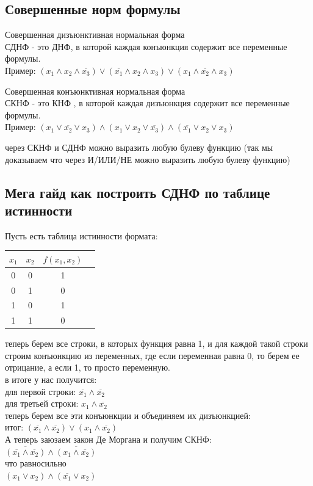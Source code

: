 \subsection{Совершенные норм формулы}
\begin{definition}{Совершенная дизъюнктивная нормальная форма}
  \\
  СДНФ - это ДНФ, в которой каждая конъюнкция содержит все переменные формулы. \\
  Пример: $(x_1 \land x_2 \land \overline{x_3}) \lor (\overline{x_1} \land x_2 \land x_3) \lor (x_1 \land \overline{x_2} \land x_3)$
\end{definition}
\begin{definition}{Совершенная конъюнктивная нормальная форма}
  \\
  СКНФ - это КНФ , в которой каждая дизъюнкция содержит все переменные формулы. \\
  Пример: $(x_1 \lor \overline{x_2} \lor x_3) \land (x_1 \lor x_2 \lor \overline{x_3}) \land (\overline{x_1} \lor x_2 \lor x_3)$
\end{definition}

через СКНФ и СДНФ можно выразить любую булеву функцию (так мы доказываем что через И/ИЛИ/НЕ можно выразить любую булеву функцию) \\

\subsection*{Мега гайд как построить СДНФ по таблице истинности} 

Пусть есть таблица истинности формата:
\begin{table}[h!]
\centering
\begin{tabular}{|c|c|c|c|}
\hline
$x_1$ & $x_2$ & $f (x_1, x_2)$ \\
\hline
0 & 0 & 1 \\
\hline
0 & 1 & 0 \\
\hline
1 & 0 & 1 \\
\hline
1 & 1 & 0 \\
\hline
\end{tabular}
\end{table}
теперь берем все строки, в которых функция равна 1, и для каждой такой строки строим конъюнкцию из переменных, где если переменная равна 0, то берем ее отрицание, а если 1, то просто переменную. \\
в итоге у нас получится: \\
для первой строки: $\overline{x_1} \land \overline{x_2}$ \\
для третьей строки: $x_1 \land \overline{x_2}$ \\
теперь берем все эти конъюнкции и объединяем их дизъюнкцией: \\
итог: $(\overline{x_1} \land \overline{x_2}) \lor (x_1 \land \overline{x_2})$ \\  
А теперь заюзаем закон Де Моргана и получим СКНФ: \\
$\overline{(\overline{x_1} \land \overline{x_2})} \land \overline{(x_1 \land \overline{x_2})}$ \\
что равносильно \\
$(x_1 \lor x_2) \land (\overline{x_1} \lor x_2)$ \\

